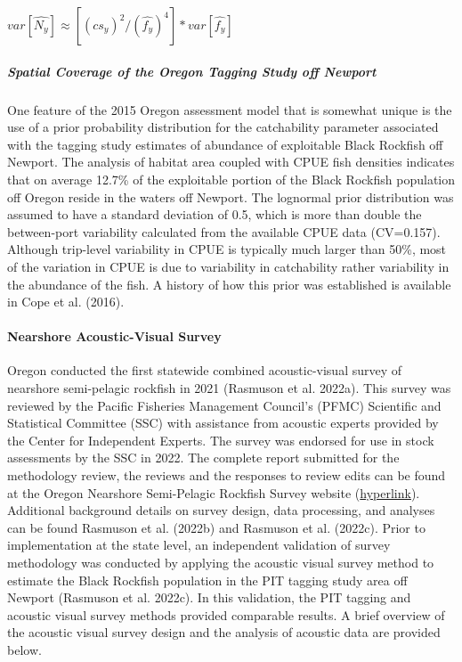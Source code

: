 \documentclass[11pt,
  letterpaper,
]{article}
\begin{document}
\(var[\hat{N_y}] \approx [(cs_y)^2/(\hat{f_y})^4]*var[\hat{f_y}]\)

\hypertarget{spatial-coverage-of-the-oregon-tagging-study-off-newport}{%
\subparagraph{Spatial Coverage of the Oregon Tagging Study off Newport}\label{spatial-coverage-of-the-oregon-tagging-study-off-newport}}

One feature of the 2015 Oregon assessment model that is somewhat unique is the use of a prior probability distribution for the catchability parameter associated with the tagging study estimates of abundance of exploitable Black Rockfish off Newport. The analysis of habitat area coupled with CPUE fish densities indicates that on average 12.7\% of the exploitable portion of the Black Rockfish population off Oregon reside in the waters off Newport. The lognormal prior distribution was assumed to have a standard deviation of 0.5, which is more than double the between-port variability calculated from the available CPUE data (CV=0.157). Although trip-level variability in CPUE is typically much larger than 50\%, most of the variation in CPUE is due to variability in catchability rather variability in the abundance of the fish. A history of how this prior was established is available in Cope et al. (2016).

\hypertarget{nearshore-acoustic-visual-survey}{%
\paragraph{Nearshore Acoustic-Visual Survey}\label{nearshore-acoustic-visual-survey}}

Oregon conducted the first statewide combined acoustic-visual survey of nearshore semi-pelagic rockfish in 2021 (Rasmuson et al. 2022a). This survey was reviewed by the Pacific Fisheries Management Council's (PFMC) Scientific and Statistical Committee (SSC) with assistance from acoustic experts provided by the Center for Independent Experts. The survey was endorsed for use in stock assessments by the SSC in 2022. The complete report submitted for the methodology review, the reviews and the responses to review edits can be found at the Oregon Nearshore Semi-Pelagic Rockfish Survey website (\href{https://nrimp.dfw.state.or.us/DataClearinghouse/default.aspx?p=202\&XMLname=42630.xml}{hyperlink}). Additional background details on survey design, data processing, and analyses can be found Rasmuson et al. (2022b) and Rasmuson et al. (2022c). Prior to implementation at the state level, an independent validation of survey methodology was conducted by applying the acoustic visual survey method to estimate the Black Rockfish population in the PIT tagging study area off Newport (Rasmuson et al. 2022c). In this validation, the PIT tagging and acoustic visual survey methods provided comparable results. A brief overview of the acoustic visual survey design and the analysis of acoustic data are provided below.
\end{document}
